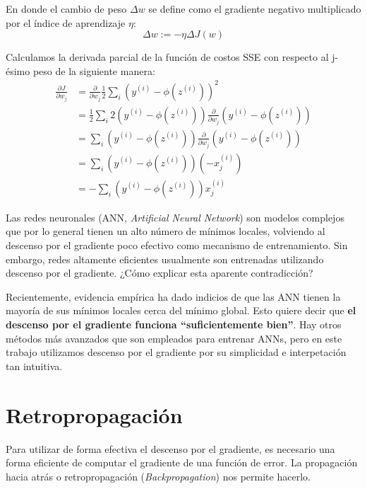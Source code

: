 En donde el cambio de peso $\Delta w$ se define como el gradiente negativo multiplicado
por el índice de aprendizaje $\eta$:
\begin{equation}
  \Delta w := -\eta \Delta J(w)
\end{equation}

Calculamos la derivada parcial de la función de costos SSE con respecto al
j-ésimo peso de la siguiente manera:
\begin{equation*}
\begin{split}
  \frac{\partial J}{\partial w_j} &= \frac{\partial}{\partial w_j}\frac{1}{2}\sum_i (y^{(i)} - \phi(z^{(i)}))^2 \\
  &= \frac{1}{2}\sum_i 2(y^{(i)} - \phi(z^{(i)}))\frac{\partial}{\partial w_j}(y^{(i)} - \phi(z^{(i)}))\\
  &= \sum_i (y^{(i)} - \phi(z^{(i)}))\frac{\partial}{\partial w_j}(y^{(i)} - \phi (z^{(i)}))\\
  &= \sum_i(y^{(i)} - \phi(z^{(i)}))(-x_j^{(i)})\\
  &= -\sum_i(y^{(i)} - \phi(z^{(i)}))x_j^{(i)}
\end{split}
\end{equation*}

Las redes neuronales (ANN, \textit{Artificial Neural Network}) son
modelos complejos que por lo general tienen un alto número de mínimos
locales, volviendo al descenso por el gradiente poco efectivo como
mecanismo de entrenamiento.  Sin embargo, redes altamente eficientes
usualmente son entrenadas utilizando descenso por el gradiente. ¿Cómo
explicar esta aparente contradicción?

Recientemente, evidencia empírica \cite{choromanska} ha dado indicios
de que las ANN tienen la mayoría de sus mínimos locales cerca del
mínimo global.  Esto quiere decir que \textbf{el descenso por el
gradiente funciona ``suficientemente bien''}. Hay otros métodos más
avanzados que son empleados para entrenar ANNs, pero en este trabajo
utilizamos descenso por el gradiente por su simplicidad e
interpetación tan intuitiva.

\section{Retropropagación}
Para utilizar de forma efectiva el descenso por el gradiente, es
necesario una forma eficiente de computar el gradiente de una función
de error. La propagación hacia atrás o retropropagación
(\textit{Backpropagation}) nos permite hacerlo.


